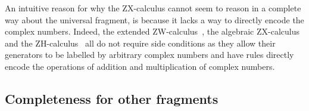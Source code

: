 \documentclass[a4paper,onecolumn,superscriptaddress,11pt,%
				unpublished,%
				allowfontchageintitle,%
				]{quantumarticle}
\begin{document}
An intuitive reason for why the ZX-calculus cannot seem to reason in a complete way about the universal fragment, is because it lacks a way to directly encode the complex numbers. Indeed, the extended ZW-calculus~\cite{HarnyAmarCompleteness}, the algebraic ZX-calculus~\cite{algebraicZX} and the ZH-calculus~\cite{backens2018zhcalculus} all do not require side conditions as they allow their generators to be labelled by arbitrary complex numbers and have rules directly encode the operations of addition and multiplication of complex numbers.



\subsection{Completeness for other fragments}\label{sec:other-fragments}
\end{document}
